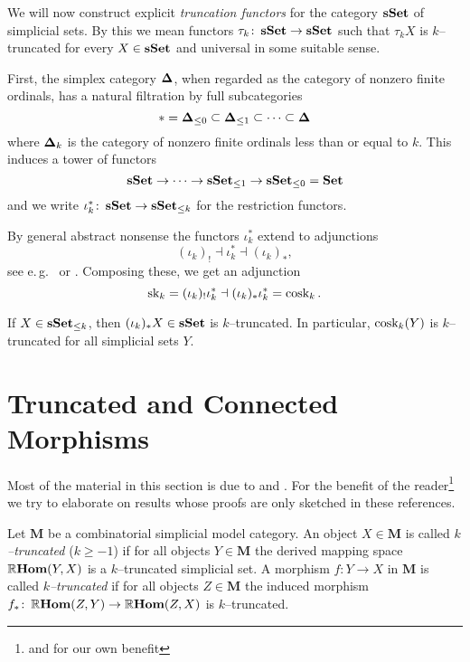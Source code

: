 We will now construct explicit \emph{truncation functors} for the
category \(\operatorname{\textnormal{\bfseries sSet}}\) of simplicial sets. By this we mean functors
\(\tau_k\colon \operatorname{\textnormal{\bfseries sSet}}\to\operatorname{\textnormal{\bfseries sSet}}\) such that \(\tau_kX\) is
\(k\)--truncated for every \(X\in\operatorname{\textnormal{\bfseries sSet}}\) and universal in some
suitable sense.

First, the simplex category \(\operatorname{\mathbf{\Delta}}\), when regarded as the
category of nonzero finite ordinals, has a natural filtration by full
subcategories
\[
* = \simplex_{\leq 0} \subset \simplex_{\leq 1} \subset\cdots\subset\simplex
\]
where \(\operatorname{\mathbf{\Delta}}_k\) is the category of nonzero finite ordinals less than
or equal to \(k\). This induces a tower of functors
\[
\operatorname{\textnormal{\bfseries sSet}} \to \cdots \to \operatorname{\textnormal{\bfseries sSet}}_{\leq 1} \to \operatorname{\textnormal{\bfseries sSet}}_{\leq 0} = \operatorname{\textnormal{\bfseries Set}}
\]
and we write \(\iota_k^*\colon \operatorname{\textnormal{\bfseries sSet}} \to \operatorname{\textnormal{\bfseries sSet}}_{\leq k}\) for the
restriction functors.

By general abstract nonsense the functors \(\iota_k^*\) extend to
adjunctions
\[
(\iota_k)_! \dashv \iota_k^* \dashv (\iota_k)_*,
\]
see e.\,g.~\cite[Theorem~4, p.~59]{sheavesgeometrylogic} or
\cite[{Exposé}~i, Proposition~5.1]{SGA4-1}. Composing these, we get an
adjunction
\[
\operatorname{\textnormal{sk}}_k = (\iota_k)_{!}\iota_k^{*} \dashv (\iota_k)_{*}\iota_k^{*} = \operatorname{\textnormal{cosk}}_k.
\]

\begin{proposition}\label{prop:cosk-is-truncated}
  If \(X\in\operatorname{\textnormal{\bfseries sSet}}_{\leq k}\), then \((\iota_k)_{*}X \in \operatorname{\textnormal{\bfseries sSet}}\) is
  \(k\)--truncated. In particular, \(\operatorname{\textnormal{cosk}}_k(Y)\) is \(k\)--truncated
  for all simplicial sets \(Y\).
\end{proposition}


\section{Truncated and Connected Morphisms}
Most of the material in this section is due to \cite{mr2522659} and
\cite{rezkhomotopytoposes}. For the benefit of the reader\footnote{and
  for our own benefit} we try to elaborate on results whose proofs are
only sketched in these references.

\begin{definition}\label{defn:truncated_object}
  Let \(\mathbf{M}\) be a combinatorial simplicial model category. An
  object \(X\in\mathbf{M}\) is called \emph{\(k\)--truncated} (\(k\geq
  -1\)) if for all objects \(Y\in\mathbf{M}\) the derived mapping
  space \(\operatorname{\mathbb{R}\textnormal{\bfseries Hom}}(Y,X)\) is a \(k\)--truncated simplicial set. A
  morphism \(f\colon Y\to X\) in \(\mathbf{M}\) is called
  \emph{\(k\)--truncated} if for all objects \(Z\in\mathbf{M}\) the
  induced morphism \(f_{*}\colon \operatorname{\mathbb{R}\textnormal{\bfseries Hom}}(Z,Y)\to\operatorname{\mathbb{R}\textnormal{\bfseries Hom}}(Z,X)\) is
  \(k\)--truncated.
\end{definition}


